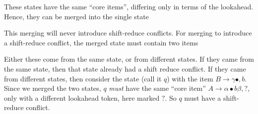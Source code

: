 These states have the same ``core items'', differing only in terms of the lookahead. Hence, they can be merged into the single state

\begin{center}
\end{center}

This merging will never introduce shift-reduce conflicts. For merging to introduce a shift-reduce conflict, the merged state must contain two items

\begin{center}
\end{center}

Either these come from the same state, or from different states. If they came from the same state, then that state already had a shift reduce conflict. If they came from different states, then consider the state (call it $q$) with the item $B \to \gamma \bullet, b$. Since we merged the two states, $q$ \textit{must} have the same ``core item'' $A \to \alpha \bullet b \beta, ?$, only with a different lookahead token, here marked $?$. So $q$ must have a shift-reduce conflict.

